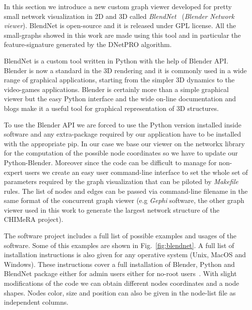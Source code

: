 \documentclass{standalone}
\begin{document}
In this section we introduce a new custom graph viewer developed for pretty small network visualization in 2D and 3D called \emph{BlendNet}~\cite{BlendNet} (\emph{Blender Network viewer}).
BlendNet is open-source and it is released under GPL license.
All the small-graphs showed in this work are made using this tool and in particular the feature-signature generated by the DNetPRO algorithm.

BlendNet is a custom tool written in Python with the help of Blender API.
Blender is now a standard in the 3D rendering and it is commonly used in a wide range of graphical applications, starting from the simpler 3D dynamics to the video-games applications.
Blender is certainly more than a simple graphical viewer but the easy Python interface and the wide on-line documentation and blogs make it a useful tool for graphical representation of 3D structures.

To use the Blender API we are forced to use the Python version installed inside software and any extra-package required by our application have to be installed with the appropriate \textsf{pip}.
In our case we base our viewer on the \textsf{networkx} library for the computation of the possible node coordinates so we have to update our Python-Blender.
Moreover since the code can be difficult to manage for non-expert users we create an easy user command-line interface to set the whole set of parameters required by the graph visualization that can be piloted by \emph{Makefile} rules.
The list of nodes and edges can be passed via command-line filename in the same format of the concurrent graph viewer (e.g \emph{Gephi} software, the other graph viewer used in this work to generate the largest network structure of the CHIMeRA project).

The software project includes a full list of possible examples and usages of the software.
Some of this examples are shown in Fig.~\ref{fig:blendnet}.
A full list of installation instructions is also given for any operative system (Unix, MacOS and Windows).
These instructions cover a full installation of Blender, Python and BlendNet package either for admin users either for no-root users~\cite{Shut}.
With slight modifications of the code we can obtain different nodes coordinates and a node shapes.
Nodes color, size and position can also be given in the node-list file as independent columns.
\end{document}
